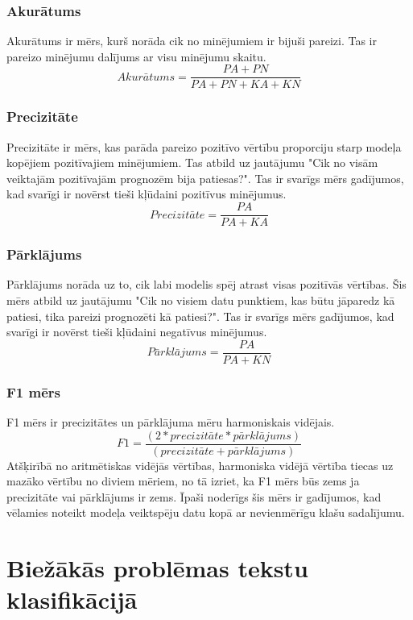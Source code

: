 \subsubsection{Akurātums}
Akurātums ir mērs, kurš norāda cik no minējumiem ir bijuši pareizi. Tas ir pareizo minējumu dalījums ar visu minējumu skaitu.
\begin{equation}
Akur\bar{a}tums = \frac{PA + PN}{PA + PN + KA + KN}
\end{equation}
\subsubsection{Precizitāte}
Precizitāte ir mērs, kas parāda pareizo pozitīvo vērtību proporciju starp modeļa kopējiem pozitīvajiem minējumiem. Tas atbild uz jautājumu "Cik no visām veiktajām pozitīvajām prognozēm bija patiesas?". Tas ir svarīgs mērs gadījumos, kad svarīgi ir novērst tieši kļūdaini pozitīvus minējumus.
\begin{equation}
Precizit\bar{a}te = \frac{PA}{PA + KA}
\end{equation}
\subsubsection{Pārklājums}
Pārklājums norāda uz to, cik labi modelis spēj atrast visas pozitīvās vērtības. Šis mērs atbild uz jautājumu "Cik no visiem datu punktiem, kas būtu jāparedz kā patiesi, tika pareizi prognozēti kā patiesi?". Tas ir svarīgs mērs gadījumos, kad svarīgi ir novērst tieši kļūdaini negatīvus minējumus.
\begin{equation}
P\bar{a}rkl\bar{a}jums = \frac{PA}{PA + KN}
\end{equation}
\subsubsection{F1 mērs}
F1 mērs ir precizitātes un pārklājuma mēru harmoniskais vidējais.
\begin{equation}
F1 = \frac{(2 * precizit\bar{a}te * p\bar{a}rkl\bar{a}jums)}{(precizit\bar{a}te + p\bar{a}rkl\bar{a}jums)}
\end{equation}
Atšķirībā no aritmētiskas vidējās vērtības, harmoniska vidējā vērtība tiecas uz mazāko vērtību no diviem mēriem, no tā izriet, ka F1 mērs būs zems ja precizitāte vai pārklājums ir zems. Īpaši noderīgs šis mērs ir gadījumos, kad vēlamies noteikt modeļa veiktspēju datu kopā ar nevienmērīgu klašu sadalījumu.

\section{Biežākās problēmas tekstu klasifikācijā}
